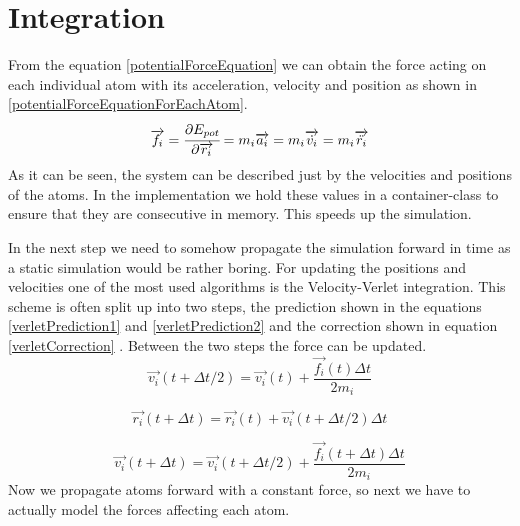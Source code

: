 \section{Integration}
\begin{comment}
- obtain force from the previous equation
- dirivation in v. r.. from the mass
- system can be discribed just by the velocity and postion of each atom
- in the simulation the positions and velocities of the individual atoms have to be tracked and updated accordingly
- most used  is the Velocity-Verlet Algorithm
\end{comment}
From the equation \ref{potentialForceEquation} we can obtain the force acting on each individual atom with its acceleration, velocity and position as shown in  \ref{potentialForceEquationForEachAtom}. 
\begin{equation}
	\label{potentialForceEquationForEachAtom}
	\overrightarrow{f_{i}} = \cfrac{\displaystyle\partial E_{pot}}{\displaystyle \partial \overrightarrow{r_{i}}} = m_{i}\overrightarrow{a_{i}} = m_{i}\overrightarrow{\dot{v_{i}}} = m_{i}\overrightarrow{\ddot{r_{i}}}
\end{equation}
As it can be seen, the system can be described just by the velocities and positions of the atoms. 
In the implementation we hold these values in a container-class to ensure that they are consecutive in  memory. This speeds up the simulation. 
\par
In the next step we need to somehow propagate the simulation forward in time as a static simulation would be rather boring. For updating the positions and velocities one of the most used algorithms is the Velocity-Verlet integration. 
This scheme is often split up into two steps, the prediction shown in the equations \ref{verletPrediction1} and \ref{verletPrediction2} and the correction shown in equation \ref{verletCorrection} \cite[cf. ][]{molDymCourse}. Between the two steps the force can be updated. 
\begin{equation}
	\label{verletPrediction1}
	\overrightarrow{v_{i}}(t+\Delta t/2) = 
	\overrightarrow{v_{i}}(t) + 
	\frac{\overrightarrow{f_{i}}(t)\Delta t}{2m_{i}}
\end{equation}

\begin{equation}
	\label{verletPrediction2}
	\overrightarrow{r_{i}}(t+\Delta t) = 
	\overrightarrow{r_{i}}(t) + \overrightarrow{v_{i}}(t + \Delta t/2)\Delta t
\end{equation}

\begin{equation}
	\label{verletCorrection}
	\overrightarrow{v_{i}}(t+\Delta t) = \overrightarrow{v_{i}}(t+\Delta t/2) +
	\frac{\overrightarrow{f_{i}}(t + \Delta t)\Delta t}{2m_{i}}
\end{equation}
Now we propagate atoms forward with a constant force, so next we have to actually model the forces affecting each atom.


